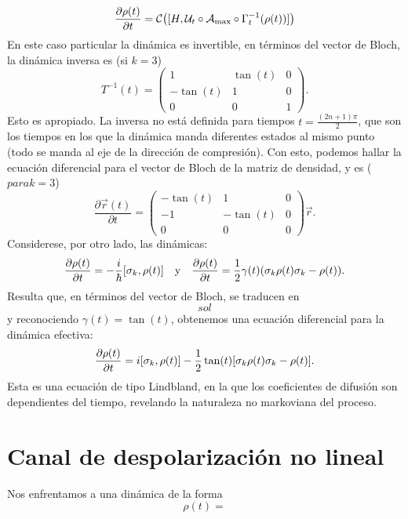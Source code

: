 \begin{equation*}
    \frac{\partial \rho(t)}{\partial t}=\mathcal{C}\qty([H,\mathcal{U}_{t}\circ\mathcal{A}_{\max}\circ\Gamma_{t}^{-1}(\rho(t))])
\end{equation*}
En este caso particular la dinámica es invertible, en términos del vector de Bloch, la dinámica inversa es (si $k=3$)
\begin{equation*}
    T^{-1}(t)=\begin{pmatrix}
        1 & \tan(t) & 0 \\
        -\tan(t) & 1 & 0 \\
        0 & 0 & 1
     \end{pmatrix}.
\end{equation*}
Esto es apropiado. La inversa no está definida para tiempos $t=\frac{(2n+1)\pi}{2}$, que son los tiempos en los que la dinámica manda diferentes estados al mismo punto (todo se manda al eje de la dirección de compresión). Con esto, podemos hallar la ecuación diferencial para el vector de Bloch de la matriz de densidad, y es ($para k=3$)
\begin{equation*}
    \frac{\partial \vec{r}(t)}{\partial t}= \begin{pmatrix}
        -\tan(t) & 1 & 0 \\
        -1 & -\tan(t) & 0 \\
        0 & 0 & 0
     \end{pmatrix}\vec{r}.
\end{equation*}
Considerese, por otro lado, las dinámicas:
\begin{align*}
    \frac{\partial \rho(t)}{\partial t}=-\frac{i}{\hbar}[\sigma_{k},\rho(t)]& & \text{y} & & \frac{\partial \rho(t)}{\partial t}=\frac{1}{2}\gamma(t)\qty(\sigma_{k}\rho(t)\sigma_{k}-\rho(t)).
\end{align*}
Resulta que, en términos del vector de Bloch, se traducen en 
\begin{equation*}
    sol
\end{equation*}
y reconociendo $\gamma(t)=\tan(t)$, obtenemos una ecuación diferencial para la dinámica efectiva:
\begin{equation*}
    \frac{\partial \rho(t)}{\partial t}=i[\sigma_{k},\rho(t)]-\frac{1}{2}\tan(t)\qty[\sigma_{k}\rho(t)\sigma_{k}-\rho(t)].
\end{equation*}
Esta es una ecuación de tipo Lindbland, en la que los coeficientes de difusión son dependientes del tiempo, revelando la naturaleza no markoviana del proceso.
\section{Canal de despolarización no lineal}
Nos enfrentamos a una dinámica de la forma 
\begin{equation*}
    \rho(t)=
\end{equation*}